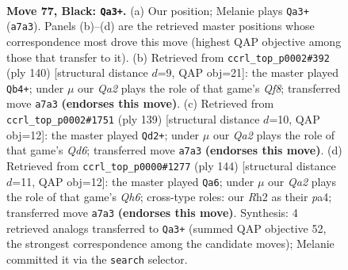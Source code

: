 \documentclass[11pt]{article}
\begin{document}
\clearpage

\begin{figure}[p]\centering
\begin{subfigure}{0.46\textwidth}\centering
\resizebox{\linewidth}{!}{%
\newchessgame
\chessboard[
  setfen={3Q4/q7/5pk1/8/8/3K2P1/7r/8 b - - 5 77},
  showmover=false,
  pgfstyle=straightmove, color=movearrow, markmove={a7-a3}
]}
\caption{}
\end{subfigure}\hfill
\begin{subfigure}{0.46\textwidth}\centering
\resizebox{\linewidth}{!}{%
\newchessgame
\chessboard[
  setfen={5Q2/8/4q1P1/8/6k1/8/4p3/7K w - - 15 71},
  showmover=false,
  pgfstyle=straightmove, color=movearrow, markmove={f8-b4}
]}
\caption{}
\end{subfigure}
\\[4pt]
\begin{subfigure}{0.46\textwidth}\centering
\resizebox{\linewidth}{!}{%
\newchessgame
\chessboard[
  setfen={8/8/2k5/4Qp2/1P6/3q4/1K6/8 b - - 11 70},
  showmover=false,
  pgfstyle=straightmove, color=movearrow, markmove={d3-d2}
]}
\caption{}
\end{subfigure}\hfill
\begin{subfigure}{0.46\textwidth}\centering
\resizebox{\linewidth}{!}{%
\newchessgame
\chessboard[
  setfen={8/8/7Q/8/pq4P1/7K/1k6/8 w - - 0 73},
  showmover=false,
  pgfstyle=straightmove, color=movearrow, markmove={h6-a6}
]}
\caption{}
\end{subfigure}
\caption{\textbf{Move 77, Black: \texttt{Qa3+}.} (a) Our position; Melanie plays \texttt{Qa3+} (\texttt{a7a3}). Panels (b)--(d) are the retrieved master positions whose correspondence most drove this move (highest QAP objective among those that transfer to it). (b) Retrieved from \texttt{ccrl\_top\_p0002\#392} (ply 140) [structural distance $d$=9, QAP obj=21]: the master played \texttt{Qb4+}; under $\mu$ our \emph{Qa2} plays the role of that game's \emph{Qf8}; transferred move \texttt{a7a3} \textbf{(endorses this move)}. (c) Retrieved from \texttt{ccrl\_top\_p0002\#1751} (ply 139) [structural distance $d$=10, QAP obj=12]: the master played \texttt{Qd2+}; under $\mu$ our \emph{Qa2} plays the role of that game's \emph{Qd6}; transferred move \texttt{a7a3} \textbf{(endorses this move)}. (d) Retrieved from \texttt{ccrl\_top\_p0000\#1277} (ply 144) [structural distance $d$=11, QAP obj=12]: the master played \texttt{Qa6}; under $\mu$ our \emph{Qa2} plays the role of that game's \emph{Qh6}; cross-type roles: our \emph{R}h2 as their \emph{p}a4; transferred move \texttt{a7a3} \textbf{(endorses this move)}. Synthesis: 4 retrieved analogs transferred to \texttt{Qa3+} (summed QAP objective 52, the strongest correspondence among the candidate moves); Melanie committed it via the \texttt{search} selector.}
\label{fig:thought-m153}
\end{figure}
\end{document}
